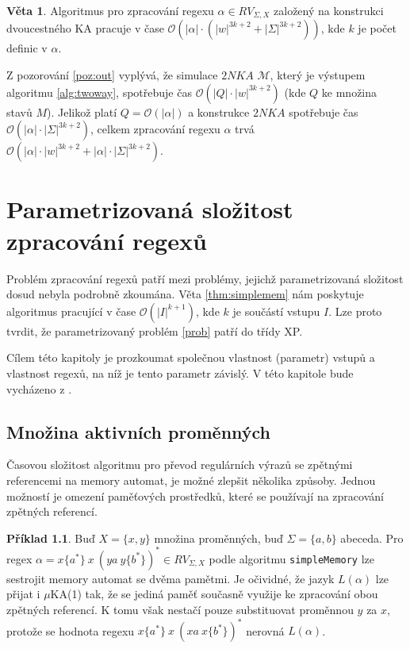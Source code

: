 \documentclass[thesis=B,czech]{FITthesis}[2019/12/23]
\theoremstyle{definition}
\newtheorem{example}{Příklad}[chapter]
\newtheorem{theorem}{Věta}[chapter]
\begin{document}
\begin{theorem}\label{thm:ctime}Algoritmus pro zpracování regexu $\alpha \in RV_{\Sigma, X}$ založený na konstrukci dvoucestného KA pracuje v čase $\mathcal{O}(|\alpha|\cdot(|w|^{3k+2} + |\Sigma|^{3k+2}))$, kde $k$ je počet definic v $\alpha$. \end{theorem}
Z pozorování \ref{poz:out} vyplývá, že simulace $2NKA$ $\mathcal{M}$, který je výstupem algoritmu \ref{alg:twoway}, spotřebuje čas $\mathcal{O}(|Q|\cdot|w|^{3k+2})$ (kde $Q$ ke množina stavů $M$). Jelikož platí $Q=\mathcal{O}(|\alpha|)$ a konstrukce $2NKA$ spotřebuje čas $\mathcal{O}(|\alpha|\cdot|\Sigma|^{3k+2})$, celkem zpracování regexu $\alpha$ trvá $\mathcal{O}(|\alpha|\cdot|w|^{3k+2} + |\alpha|\cdot|\Sigma|^{3k+2})$.
\fi
\chapter{Parametrizovaná složitost zpracování regexů}

Problém zpracování regexů patří mezi problémy, jejichž parametrizovaná složitost dosud nebyla podrobně zkoumána. Věta \ref{thm:simplemem} nám poskytuje algoritmus pracující v čase $\mathcal{O}(|I|^{k+1})$, kde $k$ je součástí vstupu $I$. Lze proto tvrdit, že parametrizovaný problém \ref{prob} patří do třídy XP.

Cílem této kapitoly je prozkoumat společnou vlastnost (parametr) vstupů a vlastnost regexů, na níž je tento parametr závislý. V této kapitole bude vycházeno z \cite{schmidref}.

\section{Množina aktivních proměnných}

Časovou složitost algoritmu pro převod regulárních výrazů se zpětnými referencemi na memory automat, je možné zlepšit několika způsoby. Jednou možností je omezení paměťových prostředků, které se používají na zpracování zpětných referencí.  

\begin{example}\label{ex:avd}
Buď $X=\{x, y\}$ množina proměnných, buď $\Sigma=\{a, b\} $ abeceda. Pro regex $\alpha = x \{a^\ast\} \ x \ ( y a \ y \{b^\ast\})^\ast \in RV_{\Sigma, X}$ podle algoritmu \texttt{simpleMemory} lze sestrojit memory automat se dvěma pamětmi. Je očividné, že jazyk $L(\alpha)$ lze přijat i $\mu$KA(1) tak, že se jediná paměť současně využije ke zpracování obou zpětných referencí. K tomu však nestačí pouze substituovat proměnnou $y$ za $x$, protože se hodnota regexu $ x \{a^\ast\} \ x \ ( xa \ x \{b^\ast\})^\ast$ nerovná $L(\alpha)$. 
\end{example}
\end{document}
